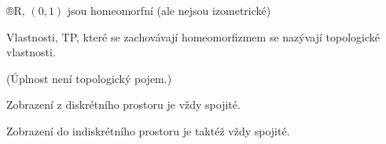 \documentclass[12pt]{article}					%
\begin{document}
        \begin{priklady}
            ®R, $(0, 1)$ jsou homeomorfní (ale nejsou izometrické)
        \end{priklady}

        \begin{poznamka}
            Vlastnosti, TP, které se zachovávají homeomorfizmem se nazývají topologické vlastnosti.

            (Úplnost není topologický pojem.)
        \end{poznamka}

        \begin{prikladyin}
            Zobrazení z diskrétního prostoru je vždy spojité.

            Zobrazení do indiskrétního prostoru je taktéž vždy spojité.
        \end{prikladyin}
\end{document}
